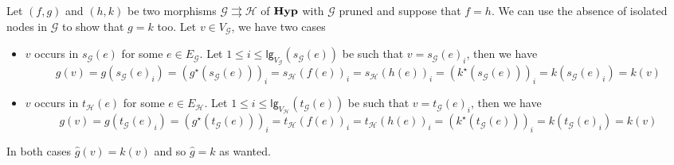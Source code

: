 \documentclass[3p]{elsarticle}
\newcommand{\lgh}{\mathsf{lg}}
\newcommand{\catname}[1]{\textbf{\textup{#1}}}
\newcommand{\hyp}{\catname{Hyp}}
\theoremstyle{remark}
\theoremstyle{definition}
\begin{document}
\begin{rem}\label{rem:mprun}
	Let $(f,g)$ and $(h, k)$ be two morphisms $\mathcal{G}\rightrightarrows \mathcal{H}$ of $\hyp$ with $\mathcal{G}$ pruned and suppose that $f=h$. We can use the absence of isolated nodes in $\mathcal{G}$ to show that $g=k$ too. Let $v\in V_{\mathcal{G}}$, we have two cases
	
	\begin{itemize}
		\item $v$ occurs in $s_{\mathcal{G}}(e)$ for some $e\in E_{\mathcal{G}}$. Let $1\leq i\leq \lgh_{V_{\mathcal{G}}}(s_{\mathcal{G}}(e))$ be such that $v=s_{\mathcal{G}}(e)_i$, then we have
		\[g(v)=g(s_{\mathcal{G}}(e)_i)=(g^\star(s_{\mathcal{G}}(e)))_i=s_{\mathcal{H}}(f(e))_i=s_{\mathcal{H}}(h(e))_i=(k^\star(s_{\mathcal{G}}(e)))_i=k(s_{\mathcal{G}}(e)_i)=k(v)\]
		\item $v$ occurs in $t_{\mathcal{H}}(e)$ for some $e\in E_{\mathcal{H}}$. Let $1\leq i\leq \lgh_{V_{\mathcal{H}}}(t_{\mathcal{G}}(e))$ be such that $v=t_{\mathcal{G}}(e)_i$, then we have
		\[g(v)=g(t_{\mathcal{G}}(e)_i)=(g^\star(t_{\mathcal{G}}(e)))_i=t_{\mathcal{H}}(f(e))_i=t_{\mathcal{H}}(h(e))_i=(k^\star(t_{\mathcal{G}}(e)))_i=k(t_{\mathcal{G}}(e)_i)=k(v)\]
	\end{itemize}
	In both cases $\hat{g}(v)=k(v)$ and so $\hat{g}= k$ as wanted.
\end{rem}
\end{document}
